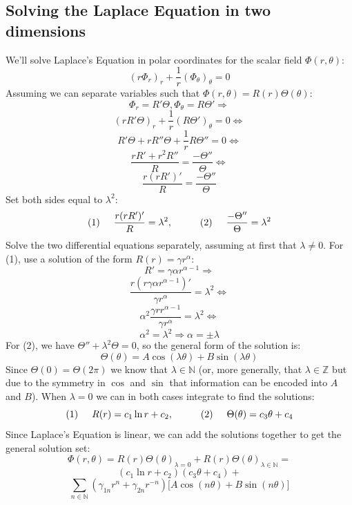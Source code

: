 \documentclass[aps,twocolumn,pre,nofootinbib]{revtex4-1}
\begin{document}
\subsection*{Solving the Laplace Equation in two dimensions}
We'll solve Laplace's Equation in polar coordinates for the scalar field $\Phi(r, \theta)$:
\[ \left( r \Phi_r \right)_r + \frac{1}{r} \left(\Phi_\theta \right)_\theta = 0 \]
Assuming we can separate variables such that $\Phi(r, \theta) = R(r)\Theta(\theta)$:
\[ \Phi_r = R'\Theta, \Phi_\theta = R\Theta' \Rightarrow \]
\[ (rR'\Theta)_r + \frac{1}{r}(R\Theta')_\theta = 0 \Leftrightarrow \]
\[ R'\Theta + rR''\Theta + \frac{1}{r}R\Theta'' = 0 \Leftrightarrow \]
\[ \frac{rR' + r^2 R''}{R} = \frac{- \Theta''}{\Theta} \Leftrightarrow \]
\[ \frac{r(rR')'}{R} = \frac{- \Theta''}{\Theta} \]
Set both sides equal to $\lambda^2$:
\[ (1) \hspace{0.5cm} \frac{r(rR')'}{R} = \lambda^2, \hspace{1cm} (2) \hspace{0.5cm} \frac{- \Theta''}{\Theta} = \lambda^2 \]
Solve the two differential equations separately, assuming at first that $\lambda \neq 0$. 
For (1), use a solution of the form $R(r) = \gamma r^\alpha$:
\[ R' = \gamma \alpha r^{\alpha - 1} \Rightarrow \]
\[ \frac{r(r\gamma \alpha r^{\alpha - 1})'}{\gamma r^\alpha} = \lambda^2 \Leftrightarrow \]
\[ \alpha^2 \frac{\gamma r r^{\alpha - 1}}{\gamma r^\alpha} = \lambda^2 \Leftrightarrow \]
\[ \alpha^2 = \lambda^2 \Rightarrow \alpha = \pm \lambda \]
For (2), we have $\Theta'' + \lambda^2 \Theta = 0$, so the general form of the solution is:
\[ \Theta(\theta) = A \cos(\lambda \theta) + B \sin(\lambda \theta) \]
Since $\Theta(0) = \Theta(2\pi)$ we know that $\lambda \in \mathbb{N}$ (or, more generally,
that $\lambda \in \mathbb{Z}$ but due to the symmetry in $\cos$ and $\sin$ that information can be encoded into $A$ and $B$).
When $\lambda = 0$ we can in both cases integrate to find the solutions:
\[ (1) \hspace{0.5cm} R(r) = c_1 \ln r + c_2,\hspace{1cm} (2)\hspace{0.5cm} \Theta(\theta) = c_3 \theta + c_4 \]
Since Laplace's Equation is linear, we can add the solutions together to get the general solution set:
\[ \Phi(r, \theta) = R(r)\Theta(\theta)_{\lambda = 0} + R(r)\Theta(\theta)_{\lambda \in \mathbb{N}} = \]
\[ (c_1 \ln r + c_2)(c_3 \theta + c_4) + \]
\[\sum_{n \in \mathbb{N}} (\gamma_{1n} r^n + \gamma_{2n} r^{-n}) 
\big[A \cos(n \theta) + B \sin(n \theta) \big] \]
\end{document}
